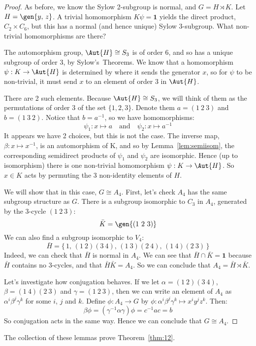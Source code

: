 \begin{proof}
    As before, we know the Sylow 2-subgroup is normal, and \(G = H \rtimes K\).
    Let \(H = \gen{y,\,z}\).
    A trivial homomorphism \(K\psi = \bm{1}\) yields the direct product, \(C_2 \times C_6\), but this has a normal (and
    hence unique) Sylow 3-subgroup.
    What non-trivial homomorphisms are there?

    The automorphism group, \(\Aut{H} \cong S_3\) is of order 6, and so has a unique subgroup of order 3, by
    Sylow's~Theorems.
    We know that a homomorphism \(\psi: K \to \Aut{H}\) is determined by where it sends the generator
    \(x\), so for \(\psi\) to be non-trivial, it must send \(x\) to an element of order 3 in \(\Aut{H}\).

    There are 2 such elements.
    Because \(\Aut{H} \cong S_3\), we will think of them as the permutations of order 3 of the set \(\{1, 2, 3\}\).
    Denote them \(a = (1\ 2\ 3)\) and \(b = (1\ 3\ 2)\).
    Notice that \(b = a^{-1}\), so we have homomorphisms:
    \[\psi_1:x \mapsto a \quad \text{and} \quad \psi_2:x \mapsto a^{-1}\]
    It appears we have 2 choices, but this is not the case.
    The inverse map, \(\beta:x \mapsto x^{-1}\), is an automorphism of K, and so by Lemma~\ref{lem:semiisom}, the
    corresponding semidirect products of \(\psi_1\) and \(\psi_2\) are isomorphic.
    Hence (up to isomorphism) there is one non-trivial homomorphism \(\psi:K \to \Aut{H}\).
    So \(x \in K\) acts by permuting the 3 non-identity elements of \(H\).

    We will show that in this case, \(G \cong A_4\).
    First, let's check \(A_4\) has the same subgroup structure as \(G\).
    There is a subgroup isomorphic to \(C_3\) in \(A_4\), generated by the 3-cycle \((1\ 2\ 3)\):
    \[\bar{K} = \gen{(1\ 2\ 3)}\]
    We can also find a subgroup isomorphic to \(V_4\):
    \[\bar{H} = \{\,1,\, (1\ 2)(3\ 4),\, (1\ 3)(2\ 4),\, (1\ 4)(2\ 3)\,\}\]
    Indeed, we can check that \(\bar{H}\) is normal in \(A_4\).
    We can see that \(\bar{H} \cap \bar{K} = \bm{1}\) because \(\bar{H}\) contains no 3-cycles, and that
    \(\bar{H}\bar{K} = A_4\).
    So we can conclude that \(A_4 = \bar{H} \rtimes \bar{K}\).

    Let's investigate how conjugation behaves.
    If we let \(\alpha = (1\ 2)(3\ 4)\), \(\beta = (1\ 4)(2\ 3)\) and \(\gamma = (1\ 2\ 3)\), then we can write an
    element of \(A_4\) as \(\alpha^i\beta^j\gamma^k\) for some \(i\), \(j\) and \(k\).
    Define \(\phi:A_4 \to G\) by \(\phi:\alpha^i\beta^j\gamma^k \mapsto x^{i}y^{j}z^{k}\).
    Then:
    \[\beta\phi = (\gamma^{-1}\alpha\gamma)\phi = c^{-1}ac = b\]
    So conjugation acts in the same way.
    Hence we can conclude that \(G \cong A_4\).
\end{proof}

The collection of these lemmas prove Theorem~\ref{thm:12}.
